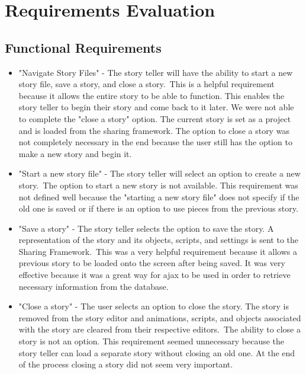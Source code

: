 \documentclass[12pt]{article}
\begin{document}
\section{Requirements Evaluation}
\subsection{Functional Requirements}
\begin{itemize}
\item "Navigate Story Files" - The story teller will have the ability to start a new story file, save a story, and close a story.\ 
This is a helpful requirement because it allows the entire story to be able to function.  This enables the story teller to begin their story and come back to it later.  We were not able to complete the "close a story" option.  The current story is set as a project and is loaded from the sharing framework.  The option to close a story was not completely necessary in the end because the user still has the option to make a new story and begin it.

\item "Start a new story file" - The story teller will select an option to create a new story.\
The option to start a new story is not available.  This requirement was not defined well because the "starting a new story file" does not specify if the old one is saved or if there is an option to use pieces from the previous story.

\item "Save a story" - The story teller selects the option to save the story.  A representation of the story and its objects, scripts, and settings is sent to the Sharing Framework.\
This was a very helpful requirement because it allows a previous story to be loaded onto the screen after being saved.  It was very effective because it was a great way for ajax to be used in order to retrieve necessary information from the database.

\item "Close a story" -  The user selects an option to close the story.  The story is removed from the story editor and animations, scripts, and objects associated with the story are cleared from their respective editors.\
The ability to close a story is not an option.  This requirement seemed unnecessary because the story teller can load a separate story without closing an old one.  At the end of the process closing a story did not seem very important.


\end{itemize}
\end{document}

